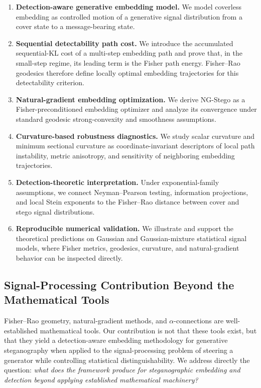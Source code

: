 \documentclass[a4paper,fleqn]{cas-dc}
\begin{document}
\begin{enumerate}
  \item \textbf{Detection-aware generative embedding model.}
  We model coverless embedding as controlled motion of a generative signal
  distribution from a cover state to a message-bearing state.

  \item \textbf{Sequential detectability path cost.}
  We introduce the accumulated sequential-KL cost of a multi-step embedding
  path and prove that, in the small-step regime, its leading term is the
  Fisher path energy. Fisher--Rao geodesics therefore define locally optimal
  embedding trajectories for this detectability criterion.

  \item \textbf{Natural-gradient embedding optimization.}
  We derive NG-Stego as a Fisher-preconditioned embedding optimizer and analyze
  its convergence under standard geodesic strong-convexity and smoothness
  assumptions.

  \item \textbf{Curvature-based robustness diagnostics.}
  We study scalar curvature and minimum sectional curvature as
  coordinate-invariant descriptors of local path instability, metric anisotropy,
  and sensitivity of neighboring embedding trajectories.

  \item \textbf{Detection-theoretic interpretation.}
  Under exponential-family assumptions, we connect Neyman--Pearson testing,
  information projections, and local Stein exponents to the Fisher--Rao
  distance between cover and stego signal distributions.

  \item \textbf{Reproducible numerical validation.}
  We illustrate and support the theoretical predictions on Gaussian and
  Gaussian-mixture statistical signal models, where Fisher metrics, geodesics,
  curvature, and natural-gradient behavior can be inspected directly.
\end{enumerate}

\subsection{Signal-Processing Contribution Beyond the Mathematical Tools}
\label{subsec:beyond_tools}

Fisher--Rao geometry, natural-gradient methods, and $\alpha$-connections are
well-established mathematical tools.
Our contribution is not that these tools exist, but that they yield a
detection-aware embedding methodology for generative steganography when applied
to the signal-processing problem of steering a generator while controlling
statistical distinguishability.
We address directly the question: \emph{what does the framework produce for
steganographic embedding and detection beyond applying established mathematical
machinery?}
\end{document}

